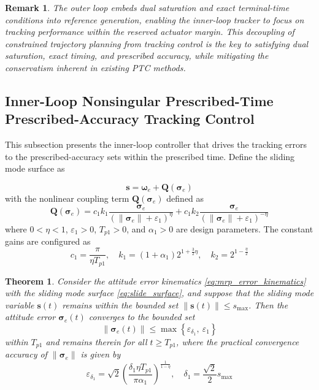 \documentclass[journal]{new-aiaa}
\newtheorem{theorem}{Theorem}
\newtheorem{remark}{Remark}
\begin{document}
\begin{remark}
The outer loop embeds dual saturation and exact terminal-time conditions into reference generation,
enabling the inner-loop tracker to focus on tracking performance within the reserved actuator margin.
This decoupling of constrained trajectory planning from tracking control is the key to 
satisfying dual saturation, exact timing, and prescribed accuracy, while mitigating the conservatism 
inherent in existing PTC methods.
\end{remark}

\subsection{Inner-Loop Nonsingular Prescribed-Time Prescribed-Accuracy Tracking Control}

This subsection presents the inner-loop controller that drives the tracking errors to the 
prescribed-accuracy sets within the prescribed time.
Define the sliding mode surface as

\begin{equation}
\boldsymbol{s} = \boldsymbol{\omega}_e + \boldsymbol{Q}(\boldsymbol{\sigma}_e)
\label{eq:slide_surface}
\end{equation}
with the nonlinear coupling term $\boldsymbol{Q}(\boldsymbol{\sigma}_e)$ defined as
\begin{equation}
\boldsymbol{Q}(\boldsymbol{\sigma}_e) 
= c_1 k_1 \frac{\boldsymbol{\sigma}_e}{(\|\boldsymbol{\sigma}_e\| + \varepsilon_1)^\eta}
+ c_1 k_2 \frac{\boldsymbol{\sigma}_e}{(\|\boldsymbol{\sigma}_e\| + \varepsilon_1)^{-\eta}}
\end{equation}
where $0 < \eta < 1$, $\varepsilon_1 > 0$, $T_{p1} > 0$, and $\alpha_1 > 0$ are design parameters. The constant gains are configured as
\[
c_1 = \frac{\pi}{\eta T_{p1}}, \quad
k_1 = (1 + \alpha_1) 2^{1 + \frac{3}{2}\eta}, \quad
k_2 = 2^{1 - \frac{\eta}{2}}
\]

\begin{theorem}
\label{thm:attitude_convergence}
Consider the attitude error kinematics \eqref{eq:mrp_error_kinematics} with the sliding mode surface \eqref{eq:slide_surface}, 
and suppose that the sliding mode variable $\boldsymbol{s}(t)$ remains within the bounded set $\|\boldsymbol{s}(t)\| \le s_{\max}$. 
Then the attitude error $\boldsymbol{\sigma}_e(t)$ converges to the bounded set
\begin{equation}
\|\boldsymbol{\sigma}_e(t)\| \le \max\left\{ \varepsilon_{\delta_1},\ \varepsilon_1 \right\}
\end{equation}
within $T_{p1}$ and remains therein for all $t\ge T_{p1}$, where the practical convergence accuracy of $\|\boldsymbol{\sigma}_e\|$ is given by
\begin{equation}
\varepsilon_{\delta_1} = \sqrt{2} \left( \frac{\delta_1 \eta T_{p1}}{\pi \alpha_1} \right)^{\frac{1}{1 - \eta}}, \quad
\delta_1 = \frac{\sqrt{2}}{2} s_{\max}
\end{equation}
\end{theorem}
\end{document}
